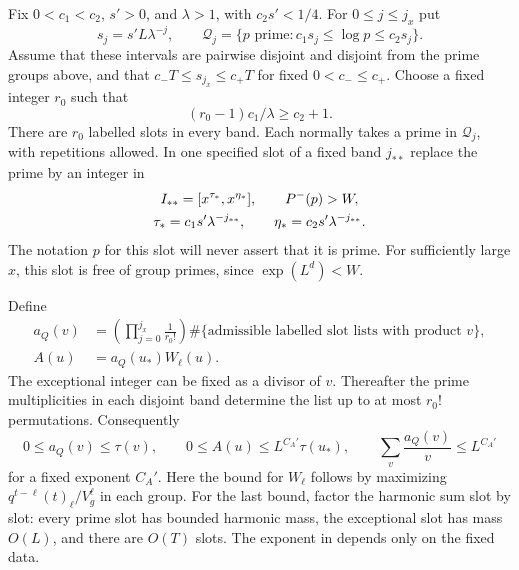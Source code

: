 Fix $0<c_1<c_2$, $s'>0$, and $\lambda>1$, with $c_2s'<1/4$.
For $0\leq j\leq j_x$ put
\[
 s_j=s'L\lambda^{-j},\qquad
 \mathcal Q_j=\{p\text{ prime}:c_1s_j\leq\log p\leq c_2s_j\}.
\]
Assume that these intervals are pairwise disjoint and disjoint from the
prime groups above, and that
$c_-T\leq s_{j_x}\leq c_+T$ for fixed $0<c_-\leq c_+$.
Choose a fixed integer $r_0$ such that
\begin{equation}\label{eq:typeii-band-room}
       (r_0-1)c_1/\lambda\geq c_2+1.
\end{equation}
There are $r_0$ labelled slots in every band. Each normally takes a prime
in $\mathcal Q_j$, with repetitions allowed. In one specified slot of a
fixed band $j_{**}$ replace the prime by an integer in
\begin{equation}\label{eq:typeii-rough-slot}
\begin{gathered}
 I_{**}=[x^{\tau_*},x^{\eta_*}],\qquad P^{-}(p)>W,\\
 \tau_*=c_1s'\lambda^{-j_{**}},\qquad
 \eta_*=c_2s'\lambda^{-j_{**}}.
\end{gathered}
\end{equation}
The notation $p$ for this slot will never assert that it is prime.
For sufficiently large $x$, this slot is free of group primes, since
$\exp(L^d)<W$.

Define
\begin{equation}\label{eq:typeii-weight}
\begin{aligned}
 a_Q(v)&=\left(\prod_{j=0}^{j_x}\frac1{r_0!}\right)
   \#\{\text{admissible labelled slot lists with product }v\},\\
 A(u)&=a_Q(u_*)W_\ell(u).
\end{aligned}
\end{equation}
The exceptional integer can be fixed as a divisor of $v$. Thereafter the
prime multiplicities in each disjoint band determine the list up to at
most $r_0!$ permutations. Consequently
\begin{equation}\label{eq:typeii-weight-bounds}
 0\leq a_Q(v)\leq\tau(v),\qquad
 0\leq A(u)\leq L^{C_A'}\tau(u_*),\qquad
 \sum_v\frac{a_Q(v)}v\leq L^{C_A'}
\end{equation}
for a fixed exponent $C_A'$. Here the bound for $W_\ell$ follows by
maximizing $q^{t-\ell}(t)_\ell/V_g^\ell$ in each group. For the last
bound, factor the harmonic sum slot by slot: every prime slot has bounded
harmonic mass, the exceptional slot has mass $O(L)$, and there are $O(T)$
slots. The exponent in  depends only on
the fixed data.

